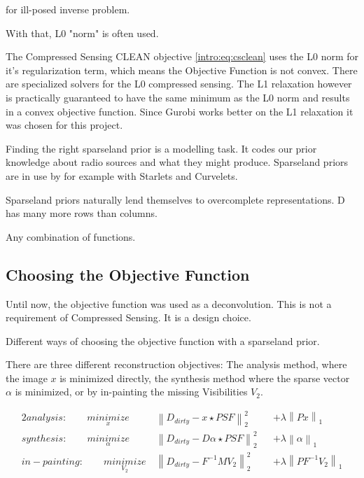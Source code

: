 for ill-posed inverse problem. 


With that, L0 "norm" is often used.

The Compressed Sensing CLEAN objective \eqref{intro:eq:csclean} uses the L0 norm for it's regularization term, which means the Objective Function is not convex. There are specialized solvers for the L0 compressed sensing. The L1 relaxation however is practically guaranteed to have the same minimum as the L0 norm and results in a convex objective function. Since Gurobi works better on the L1 relaxation it was chosen for this project.



Finding the right sparseland prior is a modelling task. It codes our prior knowledge about radio sources and what they might produce. Sparseland priors are in use by for example with Starlets\cite{starck2015starlet} and Curvelets\cite{starck2003astronomical}. 

Sparseland priors naturally lend themselves to overcomplete representations. D has many more rows than columns.

Any combination of functions.


\subsection{Choosing the Objective Function}
Until now, the objective function was used as a deconvolution. This is not a requirement of Compressed Sensing. It is a design choice.

Different ways of choosing the objective function with a sparseland prior.

There are three different reconstruction objectives: The analysis method, where the image $x$ is minimized directly, the synthesis method where the sparse vector $\alpha$ is minimized, or by in-painting the missing Visibilities $V_2$.

\begin{alignat*}{2}
analysis:\qquad \underset{x}{minimize} \:& \left \| D_{dirty} - x \star PSF \right \|_2^2 &&+  \lambda \left \| Px \right \|_1 \\
synthesis:\qquad \underset{\alpha}{minimize} \:& \left \| D_{dirty} - D \alpha \star PSF \right \|_2^2 &&+ \lambda \left \| \alpha \right \|_1 \\
in-painting:\qquad \underset{V_2}{minimize} \:& \left \|  D_{dirty} - F^{-1} M V_2 \right \|_2^2 &&+ \lambda \left \| PF^{-1}V_2\right \|_1
\end{alignat*}

